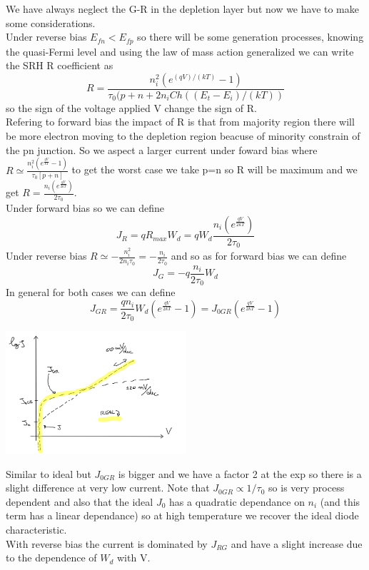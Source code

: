 We have always neglect the G-R in the depletion layer but now we have to make some considerations.\\
Under reverse bias $E_{fn}<E_{fp}$ so there will be some generation processes, knowing the quasi-Fermi level and using the law of mass action generalized we can write the SRH R coefficient as
\begin{equation}
R=\frac{n_i^2(e^{(qV)/(kT)}-1)}{\tau_0(p+n+2n_i Ch((E_t-E_i)/(kT))}
\end{equation} 
so the sign of the voltage applied V change the sign of R.\\
Refering to forward bias the impact of R is that from majority region there will be more electron moving to the depletion region beacuse of minority constrain of the pn junction. 
So we aspect a larger current under foward bias where $R\simeq \frac{n_i^2(e^{\frac{qV}{kT}}-1)}{\tau_0[p+n]}$ to get the worst case we take p=n so R will be maximum and we get $R= \frac{n_i(e^{\frac{qV}{2kT}})}{2\tau_0}$.\\
Under forward bias so we can define 
\begin{equation}
J_R=qR_{max}W_d=qW_d\frac{n_i(e^{\frac{qV}{2kT}})}{2\tau_0}
\end{equation}
Under reverse bias $R\simeq -\frac{n_i^2}{2n_i\tau_0}=-\frac{n_i}{2\tau_0}$ and so as for forward bias we can define
\begin{equation}
J_G=-q\frac{n_i}{2\tau_0}W_d
\end{equation}
In general for both cases we can define 
\begin{equation}
J_{GR}=\frac{qn_i}{2\tau_0}W_d(e^{\frac{qV}{2kT}}-1)=J_{0GR}(e^{\frac{qV}{2kT}}-1)
\end{equation}

\centering
\includegraphics[width=0.5\textwidth]{lowcurrent.png}\\
\raggedright

Similar to ideal but $J_{0GR}$ is bigger and we have a factor 2 at the exp so there is a slight difference at very low current.
Note that $J_{0GR}\propto 1/\tau_0$ so is very process dependent and also that the ideal $J_0$ has a quadratic dependance on $n_i$ (and this term has a linear dependance) so at high temperature we recover the ideal diode characteristic.\\ 
With reverse bias the current is dominated by $J_{RG}$ and have a slight increase due to the dependence of $W_d$ with V.\\

